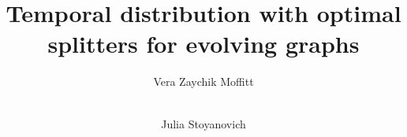 \documentclass{style/sig-alternate}
\begin{document}
\title{Temporal distribution with optimal splitters for evolving graphs}

\author{
  \alignauthor Vera Zaychik Moffitt\\
  \\
    \and
%
  \alignauthor Julia Stoyanovich\\
  \\
    \\
}

\maketitle

\thispagestyle{empty}

%
%




%
%
%

\newpage




%
\end{document}
